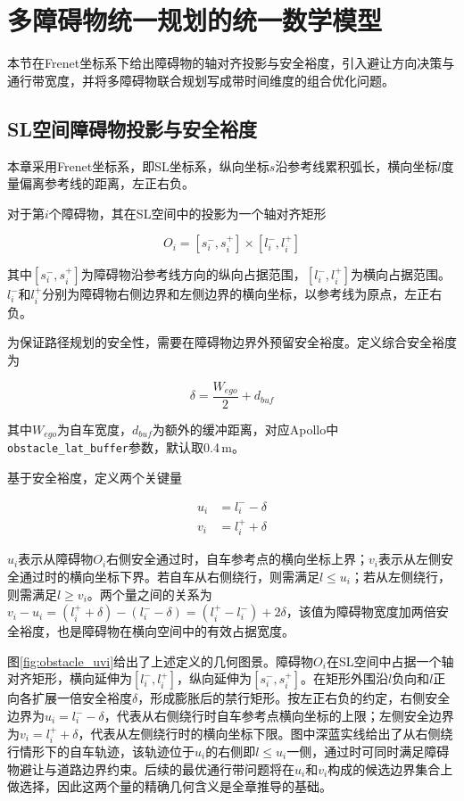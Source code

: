 \section{多障碍物统一规划的统一数学模型}
本节在Frenet坐标系下给出障碍物的轴对齐投影与安全裕度，引入避让方向决策与通行带宽度，并将多障碍物联合规划写成带时间维度的组合优化问题。

\subsection{SL空间障碍物投影与安全裕度}
本章采用Frenet坐标系，即SL坐标系，纵向坐标$s$沿参考线累积弧长，横向坐标$l$度量偏离参考线的距离，左正右负。

对于第$i$个障碍物，其在SL空间中的投影为一个轴对齐矩形

\begin{equation}
    O_i = [s_i^{-}, s_i^{+}] \times [l_i^{-}, l_i^{+}]
    \label{eq:obs_sl_proj}
\end{equation}

其中$[s_i^{-}, s_i^{+}]$为障碍物沿参考线方向的纵向占据范围，$[l_i^{-}, l_i^{+}]$为横向占据范围。$l_i^{-}$和$l_i^{+}$分别为障碍物右侧边界和左侧边界的横向坐标，以参考线为原点，左正右负。

为保证路径规划的安全性，需要在障碍物边界外预留安全裕度。定义综合安全裕度为

\begin{equation}
    \delta = \frac{W_{ego}}{2} + d_{buf}
    \label{eq:safety_margin}
\end{equation}

其中$W_{ego}$为自车宽度，$d_{buf}$为额外的缓冲距离，对应Apollo中\texttt{obstacle\_lat\_buffer}参数，默认取0.4\,m。

基于安全裕度，定义两个关键量

\begin{align}
    u_i &= l_i^{-} - \delta \label{eq:def_u} \\
    v_i &= l_i^{+} + \delta \label{eq:def_v}
\end{align}

$u_i$表示从障碍物$O_i$右侧安全通过时，自车参考点的横向坐标上界；$v_i$表示从左侧安全通过时的横向坐标下界。若自车从右侧绕行，则需满足$l \leq u_i$；若从左侧绕行，则需满足$l \geq v_i$。两个量之间的关系为$v_i - u_i = (l_i^{+} + \delta) - (l_i^{-} - \delta) = (l_i^{+} - l_i^{-}) + 2\delta$，该值为障碍物宽度加两倍安全裕度，也是障碍物在横向空间中的有效占据宽度。

图\ref{fig:obstacle_uvi}给出了上述定义的几何图景。障碍物$O_i$在SL空间中占据一个轴对齐矩形，横向延伸为$[l_i^-, l_i^+]$，纵向延伸为$[s_i^-, s_i^+]$。在矩形外围沿$l$负向和$l$正向各扩展一倍安全裕度$\delta$，形成膨胀后的禁行矩形。按左正右负的约定，右侧安全边界为$u_i = l_i^- - \delta$，代表从右侧绕行时自车参考点横向坐标的上限；左侧安全边界为$v_i = l_i^+ + \delta$，代表从左侧绕行时的横向坐标下限。图中深蓝实线给出了从右侧绕行情形下的自车轨迹，该轨迹位于$u_i$的右侧即$l \leq u_i$一侧，通过时可同时满足障碍物避让与道路边界约束。后续的最优通行带问题将在$u_i$和$v_i$构成的候选边界集合上做选择，因此这两个量的精确几何含义是全章推导的基础。


